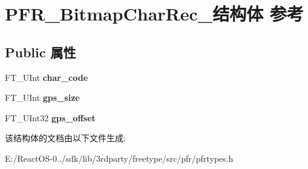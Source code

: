 \hypertarget{struct_p_f_r___bitmap_char_rec__}{}\section{P\+F\+R\+\_\+\+Bitmap\+Char\+Rec\+\_\+结构体 参考}
\label{struct_p_f_r___bitmap_char_rec__}
\subsection*{Public 属性}
\begin{DoxyCompactItemize}
\item 
\mbox{\label{struct_p_f_r___bitmap_char_rec___aacab70cdebb5a0fbc8b295c06fc3f24d}} 
F\+T\+\_\+\+U\+Int {\bfseries char\+\_\+code}
\item 
\mbox{\label{struct_p_f_r___bitmap_char_rec___a987af53e348eba5529cb542e5ac8a9f3}} 
F\+T\+\_\+\+U\+Int {\bfseries gps\+\_\+size}
\item 
\mbox{\label{struct_p_f_r___bitmap_char_rec___ad7957e4457fdae60f84befdcdfb08fc5}} 
F\+T\+\_\+\+U\+Int32 {\bfseries gps\+\_\+offset}
\end{DoxyCompactItemize}


该结构体的文档由以下文件生成\+:\begin{DoxyCompactItemize}
\item 
E\+:/\+React\+O\+S-\/0../sdk/lib/3rdparty/freetype/src/pfr/pfrtypes.\+h\end{DoxyCompactItemize}
